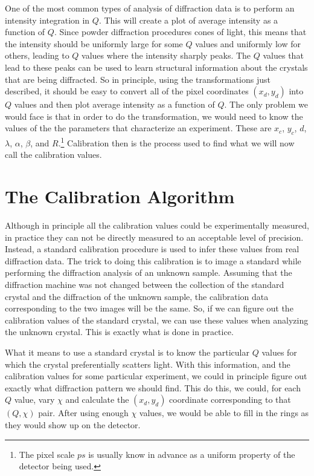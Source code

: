 One of the most common types of analysis of diffraction data
is to perform an intensity integration in $Q$. This will 
create a plot of average intensity as a function of $Q$.
Since powder diffraction procedures cones of light, this means
that the intensity should be uniformly large for some $Q$
values and uniformly low for others, leading to $Q$ values
where the intensity sharply peaks. The $Q$ values that lead 
to these peaks can be used to learn structural information
about the crystals that are being diffracted. So in principle,
using the transformations just described, it should be easy
to convert all of the pixel coordinates $(x_d,y_d)$ into
$Q$ values and then plot average intensity as a function of
$Q$. The only problem we would face is that in order to do
the transformation, we would need to know the values of the
the parameters that characterize an experiment. These are
\index{$\alpha$}\index{$\beta$}
$x_c$, $y_c$, $d$, $\lambda$, $\alpha$, $\beta$, and 
$R$.\footnote{The pixel scale $ps$ is usually know in advance 
as a uniform property of the detector being used.} Calibration
then is the process used to find what we will now call the
calibration values.

\section{The Calibration Algorithm}

Although in principle all the calibration values could be
experimentally measured, in practice they can not be
directly measured to an acceptable level of precision. 
Instead, a standard calibration procedure is used to 
infer these values from real diffraction data. The 
trick to doing this calibration is to image a standard
while performing the diffraction analysis of an 
unknown sample. Assuming that the diffraction machine
was not changed between the collection of the 
standard crystal and the diffraction of the unknown sample, 
the calibration data corresponding to the two 
images will be the same. So, if we can figure out the
calibration values of the standard crystal, we can
use these values when analyzing the unknown crystal.
This is exactly what is done in practice.

What it means to use a standard crystal is to know the
particular $Q$ values for which the crystal preferentially
scatters light. With this information, and the 
calibration values for some particular experiment,
we could in principle figure out exactly what diffraction
pattern we should find. This do this, we could, for
each $Q$ value, vary $\chi$ and calculate the 
$(x_d,y_d)$ coordinate corresponding to that $(Q,\chi)$
pair. After using enough $\chi$ values, we would be 
able to fill in the rings as they would show up on 
the detector.


